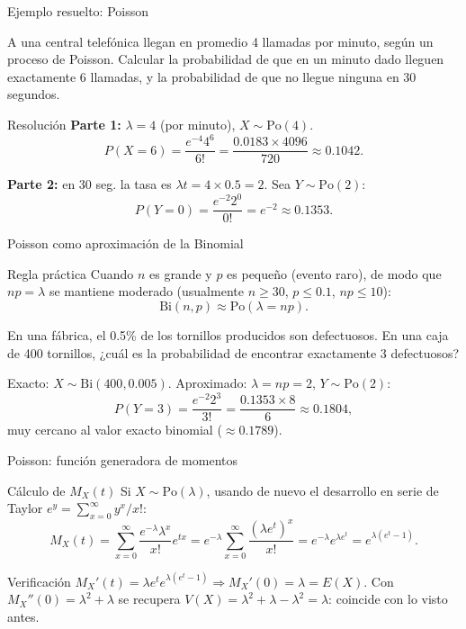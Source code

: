 \documentclass[aspectratio=169,11pt]{beamer}
\begin{document}
\begin{frame}{Ejemplo resuelto: Poisson}
\begin{example}
A una central telefónica llegan en promedio 4 llamadas por minuto, según un proceso de Poisson. Calcular la probabilidad de que en un minuto dado lleguen exactamente 6 llamadas, y la probabilidad de que no llegue ninguna en 30 segundos.
\end{example}

\begin{block}{Resolución}
\textbf{Parte 1:} $\lambda=4$ (por minuto), $X\sim\text{Po}(4)$.
$$P(X=6) = \frac{e^{-4}4^6}{6!} = \frac{0.0183\times 4096}{720} \approx 0.1042.$$

\textbf{Parte 2:} en 30 seg. la tasa es $\lambda t = 4\times 0.5 = 2$. Sea $Y\sim\text{Po}(2)$:
$$P(Y=0) = \frac{e^{-2}2^0}{0!} = e^{-2} \approx 0.1353.$$
\end{block}
\end{frame}

\begin{frame}{Poisson como aproximación de la Binomial}
\begin{block}{Regla práctica}
Cuando $n$ es grande y $p$ es pequeño (evento raro), de modo que $np=\lambda$ se mantiene moderado (usualmente $n\ge 30$, $p\le 0.1$, $np\le 10$):
$$\text{Bi}(n,p) \approx \text{Po}(\lambda=np).$$
\end{block}

\begin{example}
En una fábrica, el 0.5\% de los tornillos producidos son defectuosos. En una caja de 400 tornillos, ¿cuál es la probabilidad de encontrar exactamente 3 defectuosos?

Exacto: $X\sim\text{Bi}(400,0.005)$. Aproximado: $\lambda=np=2$, $Y\sim\text{Po}(2)$:
$$P(Y=3) = \frac{e^{-2}2^3}{3!} = \frac{0.1353\times 8}{6} \approx 0.1804,$$
muy cercano al valor exacto binomial ($\approx 0.1789$).
\end{example}
\end{frame}

\begin{frame}{Poisson: función generadora de momentos}
\begin{block}{Cálculo de $M_X(t)$}
Si $X\sim\text{Po}(\lambda)$, usando de nuevo el desarrollo en serie de Taylor $e^y=\sum_{x=0}^\infty y^x/x!$:
$$M_X(t) = \sum_{x=0}^\infty \frac{e^{-\lambda}\lambda^x}{x!}e^{tx} = e^{-\lambda}\sum_{x=0}^\infty\frac{(\lambda e^t)^x}{x!} = e^{-\lambda}e^{\lambda e^t} = e^{\lambda(e^t-1)}.$$
\end{block}

\begin{alertblock}{Verificación}
$M_X'(t) = \lambda e^t e^{\lambda(e^t-1)} \Rightarrow M_X'(0)=\lambda=E(X)$. Con $M_X''(0)=\lambda^2+\lambda$ se recupera $V(X)=\lambda^2+\lambda-\lambda^2=\lambda$: coincide con lo visto antes.
\end{alertblock}
\end{frame}
\end{document}
